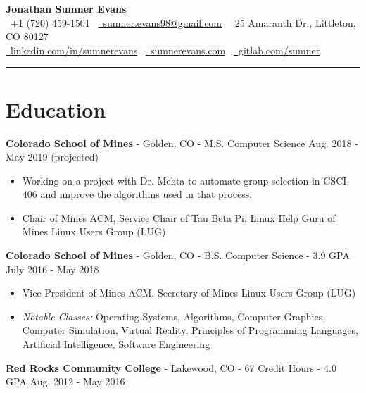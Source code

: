 \documentclass[10pt,letterpaper]{article}
\begin{document}
\begin{center}
    {\huge\textbf{Jonathan Sumner Evans}} \\
    \vspace{3pt}
    \faPhone\ +1 (720) 459-1501
    \textbar\ \href{mailto:sumner.evans98@gmail.com}{\faEnvelope\ sumner.evans98@gmail.com}
    \textbar\ \faHome\ 25 Amaranth Dr., Littleton, CO 80127 \\
    \href{https://www.linkedin.com/in/sumnerevans}{\faLinkedin\ linkedin.com/in/sumnerevans}
    \textbar\ \href{https://sumnerevans.com}{\faGlobe\ sumnerevans.com}
    \textbar\ \href{https://gitlab.com/sumner}{\faGitlab\ gitlab.com/sumner}
    \rule{\textwidth}{0.5pt}
\end{center}

\section*{Education}
\textbf{Colorado School of Mines} - Golden, CO - M.S. Computer Science
\hfill Aug. 2018 - May 2019 (projected)
\begin{itemize}
    \item Working on a project with Dr. Mehta to automate group selection in
        CSCI 406 and improve the algorithms used in that process.
    \item Chair of Mines ACM, Service Chair of Tau Beta Pi, Linux Help Guru of
        Mines Linux Users Group (LUG)
\end{itemize}

\textbf{Colorado School of Mines} - Golden, CO - B.S. Computer Science - 3.9 GPA
\hfill July 2016 - May 2018
\begin{itemize}
    \item Vice President of Mines ACM, Secretary of Mines Linux Users Group
        (LUG)
    \item \textit{Notable Classes:} Operating Systems, Algorithms, Computer
        Graphics, Computer Simulation, Virtual Reality, Principles of
        Programming Languages, Artificial Intelligence, Software Engineering
\end{itemize}

\vspace{2pt}
\textbf{Red Rocks Community College} - Lakewood, CO - 67 Credit Hours - 4.0 GPA
\hfill Aug. 2012 - May 2016
\end{document}
